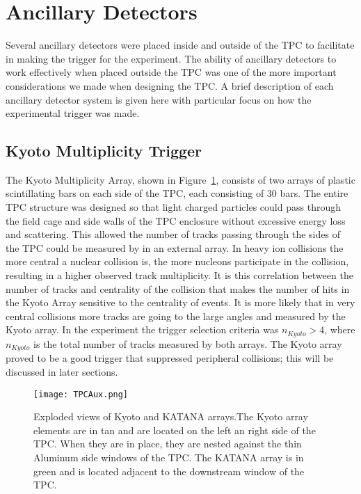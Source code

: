 \section{Ancillary Detectors }
Several ancillary detectors were placed inside and outside of the \spirit TPC to facilitate in making the trigger for the experiment. The ability of ancillary detectors to work effectively when placed outside the TPC  was one of the more important considerations we made when designing the TPC. A brief description of each ancillary detector system is given here with particular focus on how the experimental trigger was made. 


\subsection{Kyoto Multiplicity Trigger}
\label{sec:kyoto}
 The Kyoto Multiplicity Array, shown in Figure~\ref{fig:aux}, consists of two arrays of plastic scintillating bars on each side of the TPC, each consisting of 30 bars. The entire TPC structure was designed so that light charged particles could pass through the field cage and side walls of the TPC enclosure without excessive energy loss and scattering. This allowed the number of tracks passing through the sides of the TPC could be measured by in an external array. In heavy ion collisions the more central a nuclear collision is, the more nucleons participate in the collision, resulting in a higher observed track multiplicity. It is this correlation between the number of tracks and centrality of the collision that makes the number of hits in the Kyoto Array sensitive to the centrality of events. It is more likely that in very central collisions more tracks are going to the large angles and measured by the Kyoto array. In the experiment the trigger selection criteria was $n_{Kyoto} > 4$, where $n_{Kyoto}$ is the total number of tracks measured by both arrays. The Kyoto array proved to be a good trigger that suppressed peripheral collisions; this will be discussed in later sections. 

\begin{figure}[!htb]
\texttt{[image: TPCAux.png]}
\caption{Exploded views of Kyoto and KATANA arrays.The Kyoto array elements are in tan and are located on the left an right side of the TPC. When they are in place, they are nested against the thin Aluminum side windows of the TPC. The KATANA array is in green and is located adjacent to the downstream window of the TPC.}
\label{fig:aux}
\end{figure}


